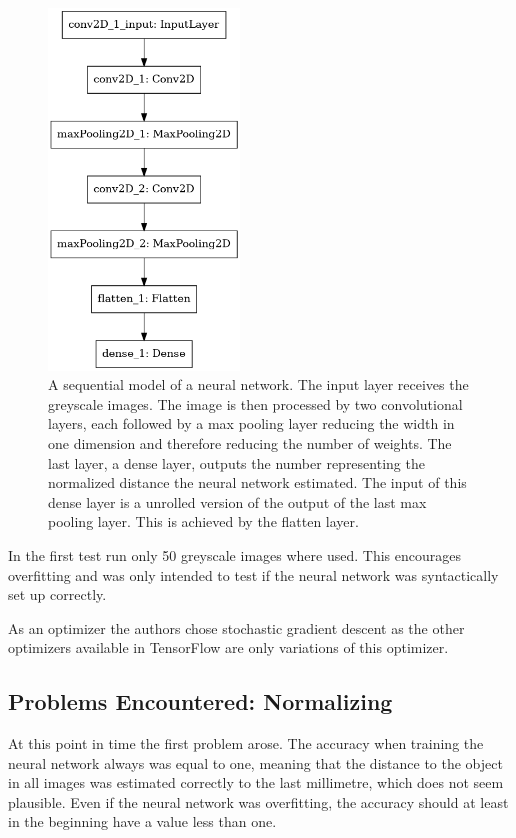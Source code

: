 \begin{figure}[h!]
	\centering
	\includegraphics[width=2in]{img/implementation_neuralNetwork_testringTheStructureOfTheNeuralNetwork_model.png}
	\caption{A sequential model of a neural network. The input layer receives the greyscale images. The image is then processed by two convolutional layers, each followed by a max pooling layer reducing the width in one dimension and therefore reducing the number of weights. The last layer, a dense layer, outputs the number representing the normalized distance the neural network estimated. The input of this dense layer is a unrolled version of the output of the last max pooling layer. This is achieved by the flatten layer.}
	\label{pic:implementation_neuralNetwork_testringTheStructureOfTheNeuralNetwork_model}
\end{figure}

In the first test run only 50 greyscale images where used. This encourages overfitting and was only intended to test if the neural network was syntactically set up correctly.

As an optimizer the authors chose stochastic gradient descent as the other optimizers available in TensorFlow are only variations of this optimizer.

\subsection{Problems Encountered: Normalizing}
At this point in time the first problem arose. The accuracy when training the neural network always was equal to one, meaning that the distance to the object in all images was estimated correctly to the last millimetre, which does not seem plausible. Even if the neural network was overfitting, the accuracy should at least in the beginning have a value less than one.

